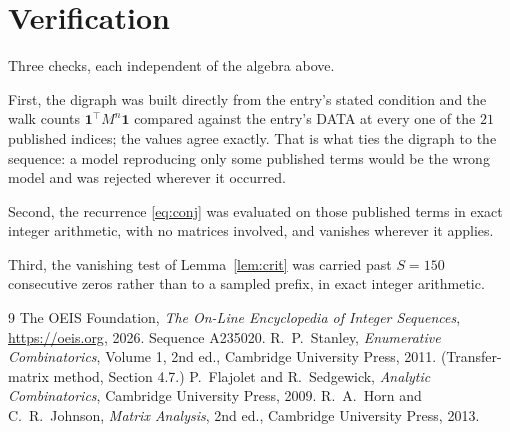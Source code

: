 \documentclass[11pt,a4paper]{article}
\theoremstyle{plain}
\theoremstyle{definition}
\begin{document}
\section{Verification}

Three checks, each independent of the algebra above.

First, the digraph was built directly from the entry's stated condition and the walk counts
$\mathbf{1}^{\!\top}M^{n}\mathbf{1}$ compared against the entry's DATA at every one of
the $21$ published indices; the values agree exactly. That is what ties the digraph to
the sequence: a model reproducing only some published terms would be the wrong model and
was rejected wherever it occurred.

Second, the recurrence \eqref{eq:conj} was evaluated on those published terms in exact
integer arithmetic, with no matrices involved, and vanishes wherever it applies.

Third, the vanishing test of Lemma~\ref{lem:crit} was carried past $S=150$ consecutive
zeros rather than to a sampled prefix, in exact integer arithmetic.

\begin{thebibliography}{9}
 The OEIS Foundation, \emph{The On-Line Encyclopedia of Integer
Sequences}, \url{https://oeis.org}, 2026. Sequence A235020.
 R.~P.~Stanley, \emph{Enumerative Combinatorics}, Volume 1, 2nd ed.,
Cambridge University Press, 2011. (Transfer-matrix method, Section 4.7.)
 P.~Flajolet and R.~Sedgewick, \emph{Analytic Combinatorics}, Cambridge
University Press, 2009.
 R.~A.~Horn and C.~R.~Johnson, \emph{Matrix Analysis}, 2nd ed., Cambridge
University Press, 2013.
\end{thebibliography}
\end{document}
